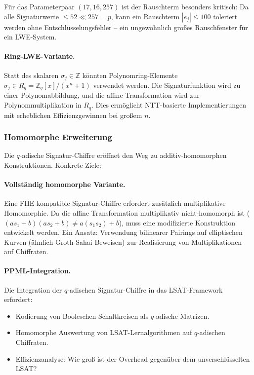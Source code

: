﻿\documentclass[a4paper,12pt]{scrreprt}
\theoremstyle{definition}
\begin{document}
Für das Parameterpaar $(17, 16, 257)$ ist der Rauschterm besonders kritisch: Da alle Signaturwerte $\leq 52 \ll 257 = p$, kann ein Rauschterm $|e_j| \leq 100$ toleriert werden ohne Entschlüsselungsfehler -- ein ungewöhnlich großes Rauschfenster für ein LWE-System.

\paragraph{Ring-LWE-Variante.}
Statt des skalaren $\sigma_j \in \mathbb{Z}$ könnten Polynomring-Elemente $\hat{\sigma}_j \in R_q = \mathbb{Z}_q[x]/(x^n+1)$ verwendet werden. Die Signaturfunktion wird zu einer Polynomabbildung, und die affine Transformation wird zur Polynommultiplikation in $R_q$. Dies ermöglicht NTT-basierte Implementierungen mit erheblichen Effizienzgewinnen bei großem $n$.

\subsubsection{Homomorphe Erweiterung}

Die $q$-adische Signatur-Chiffre eröffnet den Weg zu additiv-homomorphen Konstruktionen. Konkrete Ziele:

\paragraph{Vollständig homomorphe Variante.}
Eine FHE-kompatible Signatur-Chiffre erfordert zusätzlich multiplikative Homomorphie. Da die affine Transformation multiplikativ nicht-homomorph ist ($(as_1+b)(as_2+b) \neq a(s_1 s_2)+b$), muss eine modifizierte Konstruktion entwickelt werden. Ein Ansatz: Verwendung bilinearer Pairings auf elliptischen Kurven (ähnlich Groth-Sahai-Beweisen) zur Realisierung von Multiplikationen auf Chiffraten.

\paragraph{PPML-Integration.}
Die Integration der $q$-adischen Signatur-Chiffre in das LSAT-Framework \cite{Epp26d} erfordert:
\begin{itemize}
    \item Kodierung von Booleschen Schaltkreisen als $q$-adische Matrizen.
    \item Homomorphe Auswertung von LSAT-Lernalgorithmen auf $q$-adischen Chiffraten.
    \item Effizienzanalyse: Wie groß ist der Overhead gegenüber dem unverschlüsselten LSAT?
\end{itemize}
\end{document}
